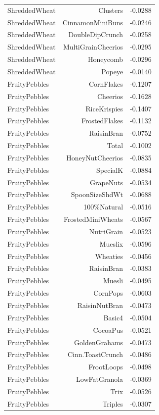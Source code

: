\begin{longtable}{@{}lrr@{}}
ShreddedWheat & Clusters & -0.0288 \\
ShreddedWheat & CinnamonMiniBuns & -0.0246 \\
ShreddedWheat & DoubleDipCrunch & -0.0258 \\
ShreddedWheat & MultiGrainCheerios & -0.0295 \\
ShreddedWheat & Honeycomb & -0.0296 \\
ShreddedWheat & Popeye & -0.0140 \\
FruityPebbles & CornFlakes & -0.1207 \\
FruityPebbles & Cheerios & -0.1628 \\
FruityPebbles & RiceKrispies & -0.1407 \\
FruityPebbles & FrostedFlakes & -0.1132 \\
FruityPebbles & RaisinBran & -0.0752 \\
FruityPebbles & Total & -0.1002 \\
FruityPebbles & HoneyNutCheerios & -0.0835 \\
FruityPebbles & SpecialK & -0.0884 \\
FruityPebbles & GrapeNuts & -0.0534 \\
FruityPebbles & SpoonSizeShdWt & -0.0688 \\
FruityPebbles & 100\%Natural & -0.0516 \\
FruityPebbles & FrostedMiniWheats & -0.0567 \\
FruityPebbles & NutriGrain & -0.0523 \\
FruityPebbles & Mueslix & -0.0596 \\
FruityPebbles & Wheaties & -0.0456 \\
FruityPebbles & RaisinBran & -0.0383 \\
FruityPebbles & Muesli & -0.0495 \\
FruityPebbles & CornPops & -0.0603 \\
FruityPebbles & RaisinNutBran & -0.0473 \\
FruityPebbles & Basic4 & -0.0504 \\
FruityPebbles & CocoaPus & -0.0521 \\
FruityPebbles & GoldenGrahams & -0.0473 \\
FruityPebbles & Cinn.ToastCrunch & -0.0486 \\
FruityPebbles & FrootLoops & -0.0498 \\
FruityPebbles & LowFatGranola & -0.0369 \\
FruityPebbles & Trix & -0.0526 \\
FruityPebbles & Triples & -0.0307 \\

\end{longtable}
